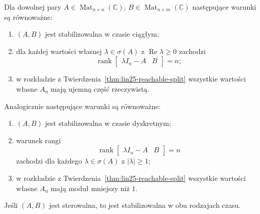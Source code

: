 \begin{twierdzenie}
\label{thm:lin25-stabilizability}
Dla dowolnej pary
\(A\in\operatorname{Mat}_{n\times n}(\mathbb C)\),
\(B\in\operatorname{Mat}_{n\times m}(\mathbb C)\)
następujące warunki
są równoważne:
\begin{enumerate}[label=\textup{(\roman*)}]
 \item \((A,B)\)
 jest stabilizowalna
 w czasie ciągłym;
 \item dla każdej wartości własnej
 \(\lambda\in\sigma(A)\)
 z \(\operatorname{Re}\lambda\ge0\)
 zachodzi
 \[
  \operatorname{rank}
  \begin{bmatrix}\lambda I_n-A&B\end{bmatrix}=n;
 \]
 \item w rozkładzie
 z Twierdzenia~\ref{thm:lin25-reachable-split}
 wszystkie wartości własne
 \(A_{\mathrm u}\)
 mają ujemną część rzeczywistą.
\end{enumerate}
Analogicznie następujące
warunki są równoważne:
\begin{enumerate}[label=\textup{(\roman*)},
                  start=4]
 \item \((A,B)\)
 jest stabilizowalna
 w czasie dyskretnym;
 \item warunek rangi
 \[
  \operatorname{rank}
  \begin{bmatrix}\lambda I_n-A&B\end{bmatrix}=n
 \]
 zachodzi dla każdego
 \(\lambda\in\sigma(A)\)
 z \(|\lambda|\ge1\);
 \item w rozkładzie
 z Twierdzenia~\ref{thm:lin25-reachable-split}
 wszystkie wartości własne
 \(A_{\mathrm u}\)
 mają moduł mniejszy niż \(1\).
\end{enumerate}
Jeśli \((A,B)\) jest sterowalna,
to jest stabilizowalna
w obu rodzajach czasu.
\end{twierdzenie}
